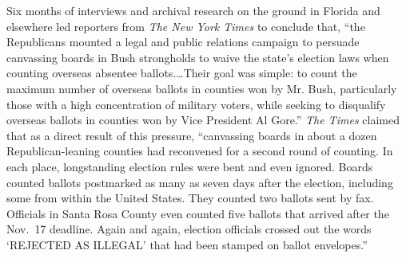 \documentclass[11pt,titlepage]{article}
\begin{document}
Six months of interviews and archival research on the ground in
Florida and elsewhere led reporters from \emph{The New York Times} to
conclude that, ``the Republicans mounted a legal and public relations
campaign to persuade canvassing boards in Bush strongholds to waive
the state's election laws when counting overseas absentee
ballots.\ldots Their goal was simple: to count the maximum number of
overseas ballots in counties won by Mr.  Bush, particularly those with
a high concentration of military voters, while seeking to disqualify
overseas ballots in counties won by Vice President Al Gore.''
\emph{The Times} claimed that as a direct result of this pressure,
``canvassing boards in about a dozen Republican-leaning counties had
reconvened for a second round of counting.  In each place,
longstanding election rules were bent and even ignored.  Boards
counted ballots postmarked as many as seven days after the election,
including some from within the United States.  They counted two
ballots sent by fax.  Officials in Santa Rosa County even counted five
ballots that arrived after the Nov.\ 17 deadline.  Again and again,
election officials crossed out the words `REJECTED AS ILLEGAL' that
had been stamped on ballot envelopes.''
\end{document}
